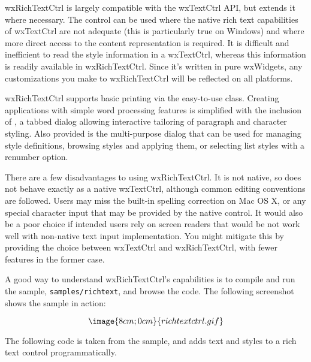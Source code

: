 wxRichTextCtrl is largely compatible with the wxTextCtrl API, but extends it where necessary.
The control can be used where the native rich text capabilities of wxTextCtrl are not
adequate (this is particularly true on Windows) and where more direct access to
the content representation is required. It is difficult and inefficient to read
the style information in a wxTextCtrl, whereas this information is readily
available in wxRichTextCtrl. Since it's written in pure wxWidgets, any customizations
you make to wxRichTextCtrl will be reflected on all platforms.

wxRichTextCtrl supports basic printing via the easy-to-use  class.
Creating applications with simple word processing features is simplified with the inclusion of\rtfsp
{}, a tabbed dialog allowing
interactive tailoring of paragraph and character styling. Also provided is the multi-purpose dialog\rtfsp
{} that can be used for
managing style definitions, browsing styles and applying them, or selecting list styles with
a renumber option.

There are a few disadvantages to using wxRichTextCtrl. It is not native,
so does not behave exactly as a native wxTextCtrl, although common editing conventions
are followed. Users may miss the built-in spelling correction on Mac OS X, or any
special character input that may be provided by the native control. It would also
be a poor choice if intended users rely on screen readers that would be not work well
with non-native text input implementation. You might mitigate this by providing
the choice between wxTextCtrl and wxRichTextCtrl, with fewer features in the
former case.

A good way to understand wxRichTextCtrl's capabilities is to compile and run the
sample, {\tt samples/richtext}, and browse the code. The following screenshot shows the sample in action:

$$\image{8cm;0cm}{richtextctrl.gif}$$

\label{wxrichtextctrlexample}

The following code is taken from the sample, and adds text and styles to a rich text control programmatically.

